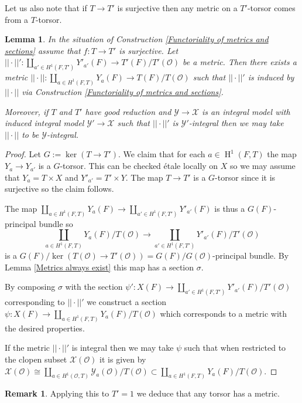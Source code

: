 \documentclass[a4paper,11pt,reqno]{amsart}
\DeclareMathOperator{\HH}{H}
\newtheorem{lemma}[theorem]{Lemma}
\theoremstyle{definition}
\newtheorem{remark}[theorem]{Remark}
\begin{document}
Let us also note that if $T \to T'$ is surjective then any metric on a $T'$-torsor comes from a $T$-torsor.
\begin{lemma}\label{lem:Metrics can be extended}
	In the situation of Construction \ref{Functoriality of metrics and sections} assume that $f: T \to T'$ is surjective. Let $||\cdot ||': \coprod_{a' \in H^1(F, T')} Y'_{a'}(F) \to T'(F)/T'(\mathcal{O})$ be a metric. Then there exists a metric $||\cdot||: \coprod_{a \in H^1(F, T)} Y_{a}(F) \to T(F)/T(\mathcal{O})$ such that $||\cdot||'$ is induced by $||\cdot||$ via Construction \ref{Functoriality of metrics and sections}.
	
	Moreover, if $T$ and $T'$ have good reduction and $\mathcal{Y} \to \mathcal{X}$ is an integral model with induced integral model $\mathcal{Y'} \to \mathcal{X}$ such that $||\cdot||'$ is $\mathcal{Y}'$-integral then we may take $||\cdot||$ to be $\mathcal{Y}$-integral. 
\end{lemma}
\begin{proof}
	Let $G := \ker(T \to T')$. We claim that for each $a \in \HH^1(F, T)$ the map $Y_a \to Y_{a'}$ is a $G$-torsor. This can be checked \'etale locally on $X$ so we may assume that $Y_a = T \times X$ and $Y'_{a'} = T' \times Y$. The map $T \to T'$ is a $G$-torsor since it is surjective so the claim follows.
	
	The map $\coprod_{a \in H^1(F, T)} Y_{a}(F) \to \coprod_{a' \in H^1(F, T')} Y'_{a'}(F)$ is thus a $G(F)$-principal bundle so 
	\begin{equation*}
		\coprod_{a \in H^1(F, T)} Y_{a}(F)/T(\mathcal{O}) \to \coprod_{a' \in H^1(F, T')} Y'_{a'}(F)/T'(\mathcal{O})
	\end{equation*}
	is a $G(F)/\ker(T(\mathcal{O}) \to T'(\mathcal{O})) = G(F)/G(\mathcal{O})$-principal bundle. By Lemma \ref{Metrics always exist} this map has a section $\sigma$.
	
	By composing $\sigma$ with the section $\psi': X(F) \to \coprod_{a' \in H^1(F, T')} Y'_{a'}(F)/T'(\mathcal{O})$ corresponding to $||\cdot||'$ we construct a section $\psi: X(F) \to \coprod_{a \in H^1(F, T)} Y_{a}(F)/T(\mathcal{O})$ which corresponds to a metric with the desired properties.
	
	If the metric $||\cdot||'$ is integral then we may take $\psi$ such that when restricted to the clopen subset $\mathcal{X}(\mathcal{O})$ it is given by $\mathcal{X}(\mathcal{O}) \cong \coprod_{a \in H^1(\mathcal{O}, T)} \mathcal{Y}_{a}(\mathcal{O})/T(\mathcal{O}) \subset \coprod_{a \in H^1(F, T)} Y_{a}(F)/T(\mathcal{O})$.
\end{proof}
\begin{remark}
	Applying this to $T' = 1$ we deduce that any torsor has a metric.
\end{remark}
\end{document}
